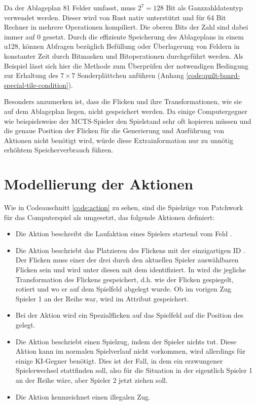 \vspace*{0.25cm}

Da der Ablageplan 81 Felder umfasst, muss $2^7=128$ Bit als Ganzzahldatentyp verwendet werden. Dieser wird von Rust nativ unterstützt und für 64 Bit Rechner in mehrere Operationen kompiliert. Die oberen Bits der Zahl sind dabei immer auf 0 gesetzt. Durch die effiziente Speicherung des Ablageplans in einem \ac{u128}, können Abfragen bezüglich Befüllung oder Überlagerung von Feldern in konstanter Zeit durch Bitmasken und Bitoperationen durchgeführt werden. Als Beispiel lässt sich hier die Methode zum Überprüfen der notwendigen Bedingung zur Erhaltung des $7\times 7$ Sonderplättchen anführen (Anhang \ref{code:quilt-board-special-tile-condition}).

Besonders anzumerken ist, dass die Flicken und ihre Transformationen, wie sie auf dem Ablageplan liegen, nicht gespeichert werden. Da einige Computergegner wie beispielsweise der \ac{MCTS}-Spieler den Spielstand sehr oft kopieren müssen und die genaue Position der Flicken für die Generierung und Ausführung von Aktionen nicht benötigt wird, würde diese Extrainformation nur zu unnötig erhöhtem Speicherverbrauch führen.

\section{Modellierung der Aktionen}

Wie in Codeauschnitt \ref{code:action} zu sehen, sind die Spielzüge von Patchwork für das Computerspiel als  umgesetzt, das folgende Aktionen definiert:

\pagebreak

\begin{itemize}
    \item Die Aktion  beschreibt die Laufaktion eines Spielers startend vom Feld .
    \item Die Aktion  beschriebt das Platzieren des Flickens mit der einzigartigen \ac{ID} . Der Flicken muss einer der drei durch den aktuellen Spieler auswählbaren Flicken sein und wird unter diesen mit dem  identifiziert. In  wird die jegliche Transformation des Flickens gespeichert, d.h. wie der Flicken gespiegelt, rotiert und wo er auf dem Spielfeld abgelegt wurde. Ob im vorigen Zug Spieler 1 an der Reihe war, wird im Attribut  gespeichert.
    \item Bei der Aktion  wird ein Spezialflicken auf das Spielfeld auf die Position des  gelegt.
    \item Die Aktion  beschriebt einen Spielzug, indem der Spieler nichts tut. Diese Aktion kann im normalen Spielverlauf nicht vorkommen, wird allerdings für einige \ac{KI}-Gegner benötigt. Dies ist der Fall, in dem ein erzwungener Spielerwechsel stattfinden soll, also für die Situation in der eigentlich Spieler 1 an der Reihe wäre, aber Spieler 2 jetzt ziehen soll.
    \item Die Aktion  kennzeichnet einen illegalen Zug.
\end{itemize}


